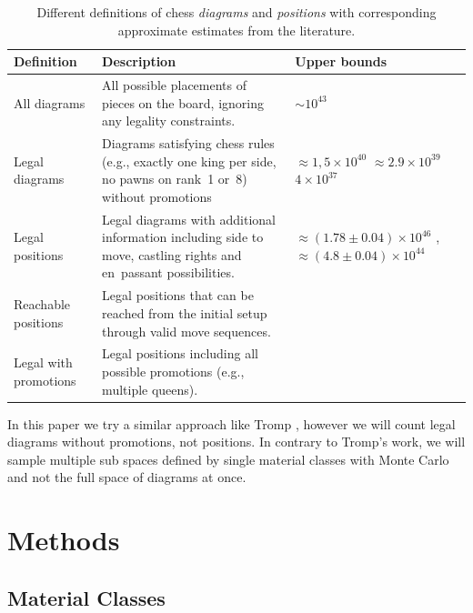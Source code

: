 \documentclass[12pt]{article}
\begin{document}
\begin{table}[h!]
\centering
\renewcommand{\arraystretch}{1.3}
\begin{tabular}{p{3.8cm} p{6.2cm} p{4.9cm}}
\toprule
\textbf{Definition} & \textbf{Description} & \textbf{Upper bounds} \\
\midrule
All diagrams & All possible placements of pieces on the board, ignoring any legality constraints. 
& $\sim 10^{43}$ \cite{shannon1950} \\[0.3em]

Legal diagrams & Diagrams satisfying chess rules (e.g., exactly one king per side, no pawns on rank~1 or~8) without promotions 
& $\approx 1,5\times10^{40}$ \cite{steinerberger2015} $\approx 2.9\times10^{39}$ \cite{tromp2021b} $4\times 10^{37}$ \cite{gourion2021} \\[0.3em]

Legal positions & Legal diagrams with additional information including side to move, castling rights and en~passant possibilities. 
& $\approx (1.78\pm0.04)\times10^{46}$ \cite{chinchalkar1996} , $\approx (4.8\pm0.04)\times10^{44}$ \cite{tromp2021b} \\[0.3em]

Reachable positions & Legal positions that can be reached from the initial setup through valid move sequences. 
&  \\[0.3em]

Legal with promotions & Legal positions including all possible promotions (e.g., multiple queens). 
& \\
\bottomrule
\end{tabular}
\caption{Different definitions of chess \textit{diagrams} and \textit{positions} with corresponding approximate estimates from the literature.}
\label{tab:definitions}
\end{table}

In this paper we try a similar approach like Tromp \cite{tromp2021b}, however we will count legal diagrams without promotions, not positions. In contrary to Tromp's work, we will sample multiple sub spaces defined by single material classes with Monte Carlo and not the full space of diagrams at once.


\section{Methods}

\subsection{Material Classes}
\end{document}
